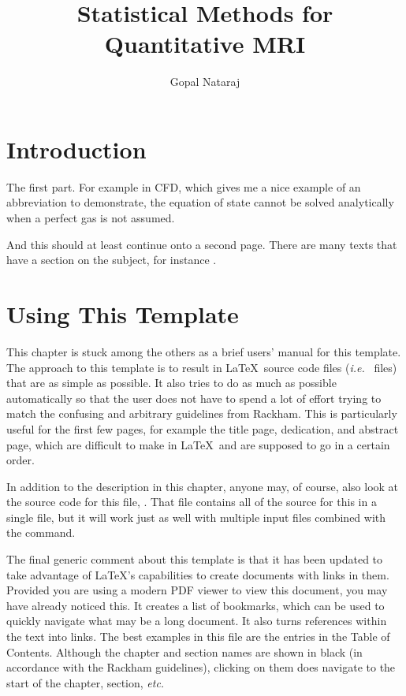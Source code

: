 \documentclass[thesis]{../cls/thesis-umich}
\title{Statistical Methods for Quantitative MRI}
\author{Gopal Nataraj}
\begin{document}
\chapter{Introduction}   \label{chap:intro}
The first part.  For example in \ac{CFD}, which gives me a nice
example of an abbreviation to demonstrate, the equation of state
cannot be solved analytically when a perfect gas is not assumed.


\newpage

And this should at least continue onto a second page.  There are many
texts that have a section on the subject, for instance
\cite{chapra:2002:numerics}.

\chapter{Using This Template}   \label{chap:manual}
This chapter is stuck among the others as a brief users' manual for this
template.  The approach to this template is to result in \LaTeX~source
code files (\textit{i.e.}~ files) that are as simple as
possible.  It also tries to do as much as possible automatically so that
the user does not have to spend a lot of effort trying to match the
confusing and arbitrary guidelines from Rackham.  This is particularly
useful for the first few pages, for example the title page, dedication,
and abstract page, which are difficult to make in \LaTeX~and are
supposed to go in a certain order.

In addition to the description in this chapter, anyone may, of course,
also look at the source code for this file, .
That file contains all of the source for this  in a single
file, but it will work just as well with multiple input files combined
with the \verb|| command.

The final generic comment about this template is that it has been
updated to take advantage of \LaTeX's capabilities to create documents
with links in them.  Provided you are using a modern PDF viewer to view
this document, you may have already noticed this.  It creates a list of
bookmarks, which can be used to quickly navigate what may be a long
document.  It also turns references within the text into links.  The
best examples in this file are the entries in the Table of Contents.
Although the chapter and section names are shown in black (in accordance
with the Rackham guidelines), clicking on them does navigate to the
start of the chapter, section, \textit{etc.}
\end{document}
